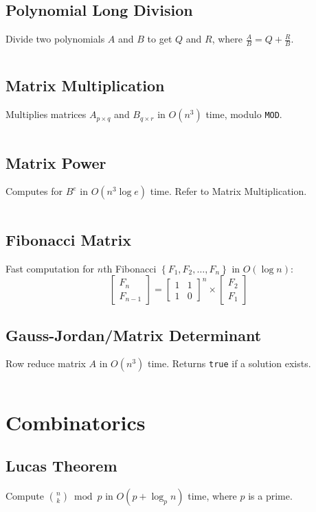 \documentclass[8pt,a4paper,landscape,oneside]{amsart}
\newcommand{\code}[1]{\inputminted[fontsize=\normalsize,baselinestretch=1]{cpp}{_code/#1}}
\begin{document}
\begin{multicols*}{3}
  \subsection{Polynomial Long Division}
    Divide two polynomials $A$ and $B$ to get $Q$ and $R$, where $\frac{A}{B} = Q + \frac{R}{B}$.
    \code{algebra/poly-long-div.cpp}
  \subsection{Matrix Multiplication}
    Multiplies matrices $A_{p\times q}$ and $B_{q\times r}$ in $O(n^3)$ time, modulo \texttt{MOD}.
    \code{algebra/matmul.java}
  \subsection{Matrix Power}
    Computes for $B^e$ in $O(n^3 \log e)$ time. Refer to Matrix Multiplication.
    \code{algebra/matpow.java}
  \subsection{Fibonacci Matrix}
    Fast computation for $n$th Fibonacci $\left\{F_1,F_2,\ldots,F_n \right\}$ in $O(\log n)$:
    \[
    \begin{bmatrix}
        F_n \\
        F_{n-1}
    \end{bmatrix}
    =
    \begin{bmatrix}
        1 & 1 \\
        1 & 0
    \end{bmatrix}^n
    \times
    \begin{bmatrix}
        F_2 \\
        F_1
    \end{bmatrix}
    \]
  \subsection{Gauss-Jordan/Matrix Determinant}
    Row reduce matrix $A$ in $O(n^3)$ time. Returns \texttt{true} if a solution exists.
    \code{algebra/gauss-jordan.java}
\section{Combinatorics}
  \subsection{Lucas Theorem}
    Compute $\binom{n}{k} \bmod{p}$ in $O(p + \log_p n)$ time, where $p$ is a prime.
    \code{combs/lucas.cpp}

\end{multicols*}
\end{document}

